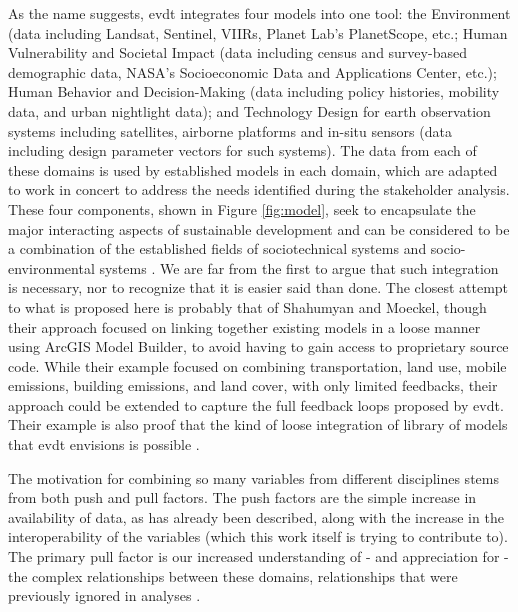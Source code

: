 \documentclass[notitlepage]{article}
\begin{document}
As the name suggests, \ac{evdt} integrates four models into one tool: the Environment (data including Landsat, Sentinel, VIIRs, Planet Lab’s PlanetScope, etc.; Human Vulnerability and Societal Impact (data including census and survey-based demographic data, NASA’s Socioeconomic Data and Applications Center, etc.); Human Behavior and Decision-Making (data including policy histories, mobility data, and urban nightlight data); and Technology Design for earth observation systems including satellites, airborne platforms and in-situ sensors (data including design parameter vectors for such systems). The data from each of these domains is used by established models in each domain, which are adapted to work in concert to address the needs identified during the stakeholder analysis. These four components, shown in Figure \ref{fig:model}, seek to encapsulate the major interacting aspects of sustainable development and can be considered to be a combination of the established fields of sociotechnical systems \cite{rouseUnderstandingChangeComplex2012,siddiqiSociotechnicalSystemsSustainability2017,sussmanTeachingComplexSociotechnical2010} and socio-environmental systems \cite{elsawahEightGrandChallenges2020}. We are far from the first to argue that such integration is necessary, nor to recognize that it is easier said than done. The closest attempt to what is proposed here is probably that of Shahumyan and Moeckel, though their approach focused on linking together existing models in a loose manner using ArcGIS Model Builder, to avoid having to gain access to proprietary source code. While their example focused on combining transportation, land use, mobile emissions, building emissions, and land cover, with only limited feedbacks, their approach could be extended to capture the full feedback loops proposed by \ac{evdt}. Their example is also proof that the kind of loose integration of library of models that \ac{evdt} envisions is possible \cite{shahumyanIntegrationLandUse2017}. 

The motivation for combining so many variables from different disciplines stems from both push and pull factors. The push factors are the simple increase in availability of data, as has already been described, along with the increase in the interoperability of the variables (which this work itself is trying to contribute to). The primary pull factor is our increased understanding of - and appreciation for - the complex relationships between these domains, relationships that were previously ignored in analyses \cite{gaheganMultivariateGeovisualization2007}. 
\end{document}
